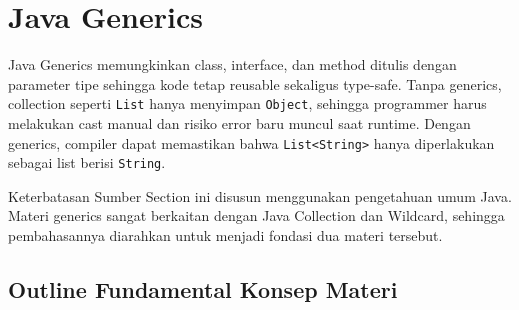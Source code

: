 \section{Java Generics}

Java Generics memungkinkan class, interface, dan method ditulis dengan parameter tipe sehingga kode tetap reusable sekaligus type-safe. Tanpa generics, collection seperti \texttt{List} hanya menyimpan \texttt{Object}, sehingga programmer harus melakukan cast manual dan risiko error baru muncul saat runtime. Dengan generics, compiler dapat memastikan bahwa \texttt{List<String>} hanya diperlakukan sebagai list berisi \texttt{String}.

\begin{cmt}{Keterbatasan Sumber}{}
Section ini disusun menggunakan pengetahuan umum Java. Materi generics sangat berkaitan dengan Java Collection dan Wildcard, sehingga pembahasannya diarahkan untuk menjadi fondasi dua materi tersebut.
\end{cmt}

\subsection{Outline Fundamental Konsep Materi}

